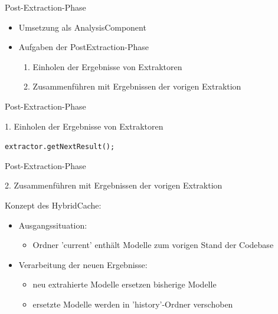 \documentclass[aspectratio=43, noserifmath]{beamer}
\begin{document}
\begin{frame}[containsverbatim]{Post-Extraction-Phase}

\begin{itemize}
    \item[\textbullet] Umsetzung als AnalysisComponent
    \item[\textbullet] Aufgaben der PostExtraction-Phase \\
    \begin{enumerate}
       \item Einholen der Ergebnisse von Extraktoren
       \item Zusammenf\"uhren mit Ergebnissen der vorigen Extraktion
    \end{enumerate}
\end{itemize}
\end{frame}


\begin{frame}[containsverbatim]{Post-Extraction-Phase}

1. Einholen der Ergebnisse von Extraktoren

\texttt{extractor.getNextResult();}

\end{frame}

\begin{frame}[containsverbatim]{Post-Extraction-Phase}

2. Zusammenf\"uhren mit Ergebnissen der vorigen Extraktion

Konzept des HybridCache:
\begin{itemize}
    \item Ausgangssituation: \\ 
    \begin{itemize}
        \item[\textbullet]  Ordner 'current' enth\"alt Modelle zum vorigen Stand der Codebase
    \end{itemize}
    \item Verarbeitung der neuen Ergebnisse: \\
    \begin{itemize}
        \item[\textbullet] neu extrahierte Modelle ersetzen bisherige Modelle 
        \item[\textbullet] ersetzte Modelle werden in 'history'-Ordner verschoben
    \end{itemize}
\end{itemize}


\end{frame}
\end{document}
